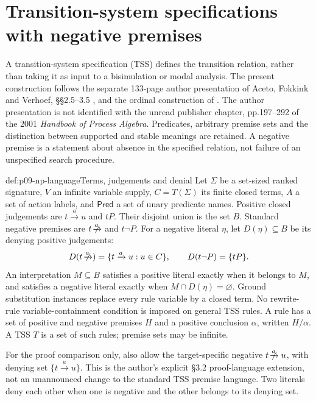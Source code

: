 \section{Transition-system specifications with negative premises}
\label{sec:p09-negative-premises}

A transition-system specification (TSS) defines the transition relation,
rather than taking it as input to a bisimulation or modal analysis.
The present construction follows the separate 133-page author presentation
of Aceto, Fokkink and Verhoef, \S\S2.5--3.5
\parencite{AcetoFokkinkVerhoefSOSAuthorNP}, and the ordinal construction
of \textcite[\S2]{Groote1993NegativePremises}. The author presentation
is not identified with the unread publisher chapter, pp.197--292 of
the 2001 \emph{Handbook of Process Algebra}. Predicates, arbitrary
premise sets and the distinction between supported and stable meanings
are retained. A negative premise is a statement about absence in the
specified relation, not failure of an unspecified search procedure.

\begin{hbdefinition}{def:p09-np-language}{Terms, judgements and denial}
Let \(\Sigma\) be a set-sized ranked signature, \(V\) an infinite
variable supply, \(C=T(\Sigma)\) its finite closed terms, \(A\)
a set of action labels, and \(\mathsf{Pred}\) a set of unary
predicate names. Positive closed judgements are \(t\xrightarrow a u\)
and \(tP\). Their disjoint union is the set \(B\).
Standard negative premises are \(t\mathrel{\not\!\xrightarrow a}\)
and \(t\neg P\). For a negative literal \(\eta\), let
\(D(\eta)\subseteq B\) be its denying positive judgements:
\[
 D(t\mathrel{\not\!\xrightarrow a})=
       \{t\xrightarrow a u:u\in C\},\qquad
 D(t\neg P)=\{tP\}.
\]
An interpretation \(M\subseteq B\) satisfies a positive literal
exactly when it belongs to \(M\), and satisfies a negative literal
exactly when \(M\cap D(\eta)=\varnothing\).
Ground substitution instances replace every rule variable by a closed
term. No rewrite-rule variable-containment condition is imposed on
general TSS rules. A rule has a set of positive and negative premises
\(H\) and a positive conclusion \(\alpha\), written \(H/\alpha\).
A TSS \(T\) is a set of such rules; premise sets may be infinite.

For the proof comparison only, also allow the target-specific negative
\(t\mathrel{\not\!\xrightarrow a}u\), with denying set
\(\{t\xrightarrow a u\}\). This is the author's explicit
\S3.2 proof-language extension, not an unannounced change to the
standard TSS premise language. Two literals deny each other when one
is negative and the other belongs to its denying set.
\end{hbdefinition}

